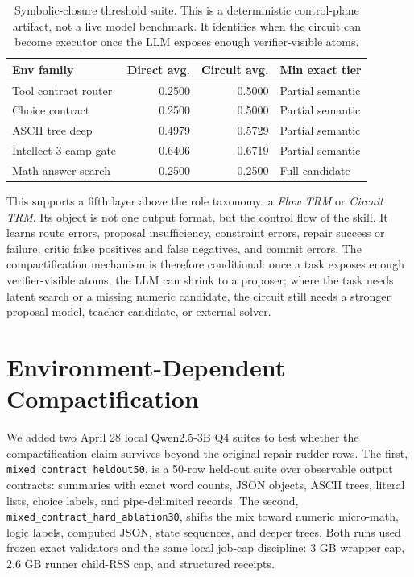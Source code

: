 \documentclass[11pt]{article}
\begin{document}
\begin{table}[t]
  \centering
  \small
  \begin{tabular}{lrrl}
    \toprule
    Env family & Direct avg. & Circuit avg. & Min exact tier \\
    \midrule
    Tool contract router & 0.2500 & 0.5000 & Partial semantic \\
    Choice contract & 0.2500 & 0.5000 & Partial semantic \\
    ASCII tree deep & 0.4979 & 0.5729 & Partial semantic \\
    Intellect-3 camp gate & 0.6406 & 0.6719 & Partial semantic \\
    Math answer search & 0.2500 & 0.2500 & Full candidate \\
    \bottomrule
  \end{tabular}
  \caption{Symbolic-closure threshold suite. This is a deterministic control-plane artifact, not a live model benchmark. It identifies when the circuit can become executor once the LLM exposes enough verifier-visible atoms.}
  \label{tab:symbolic-closure}
\end{table}

This supports a fifth layer above the role taxonomy: a \emph{Flow TRM} or \emph{Circuit TRM}. Its object is not one output format, but the control flow of the skill. It learns route errors, proposal insufficiency, constraint errors, repair success or failure, critic false positives and false negatives, and commit errors. The compactification mechanism is therefore conditional: once a task exposes enough verifier-visible atoms, the LLM can shrink to a proposer; where the task needs latent search or a missing numeric candidate, the circuit still needs a stronger proposal model, teacher candidate, or external solver.

\section{Environment-Dependent Compactification}

We added two April 28 local Qwen2.5-3B Q4 suites to test whether the compactification claim survives beyond the original repair-rudder rows. The first, \texttt{mixed\_contract\_heldout50}, is a 50-row held-out suite over observable output contracts: summaries with exact word counts, JSON objects, ASCII trees, literal lists, choice labels, and pipe-delimited records. The second, \texttt{mixed\_contract\_hard\_ablation30}, shifts the mix toward numeric micro-math, logic labels, computed JSON, state sequences, and deeper trees. Both runs used frozen exact validators and the same local job-cap discipline: 3 GB wrapper cap, 2.6 GB runner child-RSS cap, and structured receipts.
\end{document}
